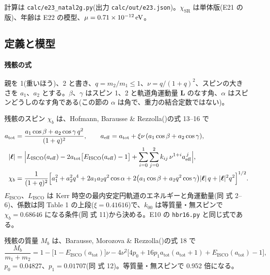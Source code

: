計算は \texttt{calc/e23\_natal2g.py}(出力 \texttt{calc/out/e23.json})。$\chi_\mathrm{SR}$ は単体版(E21 の版)、年齢は E22 の模型、$\mu=0.71\times10^{-12}\,\mathrm{eV}$。

\subsection{定義と模型}

\paragraph{残骸の式}
親を 1(重いほう)、2 と書き、$q=m_2/m_1\le1$、$\nu=q/(1+q)^2$、スピンの大きさを $a_1$、$a_2$ とする。$\beta$、$\gamma$ はスピン 1、2 と軌道角運動量 $\boldsymbol L$ のなす角、$\alpha$ はスピンどうしのなす角である(この節の $\alpha$ は角で、重力の結合定数ではない)。

残骸のスピン $\chi_b$ は、Hofmann, Barausse \& Rezzolla()の式 13--16 で
\begin{align}
a_\mathrm{tot}&=\frac{a_1\cos\beta+a_2\cos\gamma\,q^2}{(1+q)^2},\qquad a_\mathrm{eff}=a_\mathrm{tot}+\xi\nu\,(a_1\cos\beta+a_2\cos\gamma),\nonumber\\
|\boldsymbol\ell|&=\Bigl|L_\mathrm{ISCO}(a_\mathrm{eff})-2a_\mathrm{tot}\bigl[E_\mathrm{ISCO}(a_\mathrm{eff})-1\bigr]+\sum_{i=0}^{1}\sum_{j=0}^{2}k_{ij}\,\nu^{1+i}a_\mathrm{eff}^{\,j}\Bigr|,\nonumber\\
\chi_b&=\frac{1}{(1+q)^2}\Bigl[a_1^2+a_2^2q^4+2a_1a_2q^2\cos\alpha+2\bigl(a_1\cos\beta+a_2q^2\cos\gamma\bigr)|\boldsymbol\ell|\,q+|\boldsymbol\ell|^2q^2\Bigr]^{1/2}.
\label{eq:e23spin}
\end{align}
$E_\mathrm{ISCO}$、$L_\mathrm{ISCO}$ は Kerr 時空の最内安定円軌道のエネルギーと角運動量(同 式 2--6)、係数は同 Table 1 の上段($\xi=0.41616$)で、$k_{00}$ は等質量・無スピンで $\chi_b=0.68646$ になる条件(同 式 11)から決める。E10 の \texttt{hbr16.py} と同じ式である。

残骸の質量 $M_b$ は、Barausse, Morozova \& Rezzolla()の式 18 で
\begin{equation}
\frac{M_b}{m_1+m_2}=1-\bigl[1-E_\mathrm{ISCO}(a_\mathrm{tot})\bigr]\nu-4\nu^2\bigl[4p_0+16p_1a_\mathrm{tot}(a_\mathrm{tot}+1)+E_\mathrm{ISCO}(a_\mathrm{tot})-1\bigr],
\label{eq:e23mass}
\end{equation}
$p_0=0.04827$、$p_1=0.01707$(同 式 12)。等質量・無スピンで 0.952 倍になる。


